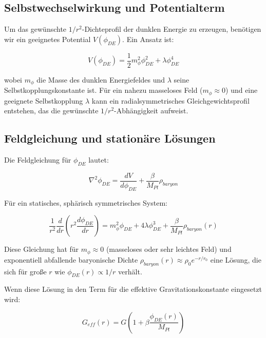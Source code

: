 \documentclass[a4paper,12pt]{article}
\begin{document}
\subsection{Selbstwechselwirkung und Potentialterm}

Um das gewünschte $1/r^2$-Dichteprofil der dunklen Energie zu erzeugen, benötigen wir ein geeignetes Potential $V(\phi_{DE})$. Ein Ansatz ist:

\begin{equation}
	V(\phi_{DE}) = \frac{1}{2}m_{\phi}^2\phi_{DE}^2 + \lambda \phi_{DE}^4
\end{equation}

wobei $m_{\phi}$ die Masse des dunklen Energiefeldes und $\lambda$ seine Selbstkopplungskonstante ist. Für ein nahezu masseloses Feld ($m_{\phi} \approx 0$) und eine geeignete Selbstkopplung $\lambda$ kann ein radialsymmetrisches Gleichgewichtsprofil entstehen, das die gewünschte $1/r^2$-Abhängigkeit aufweist.

\subsection{Feldgleichung und stationäre Lösungen}

Die Feldgleichung für $\phi_{DE}$ lautet:

\begin{equation}
	\nabla^2 \phi_{DE} = \frac{dV}{d\phi_{DE}} + \frac{\beta}{M_{Pl}}\rho_{baryon}
\end{equation}

Für ein statisches, sphärisch symmetrisches System:

\begin{equation}
	\frac{1}{r^2}\frac{d}{dr}\left(r^2\frac{d\phi_{DE}}{dr}\right) = m_{\phi}^2\phi_{DE} + 4\lambda\phi_{DE}^3 + \frac{\beta}{M_{Pl}}\rho_{baryon}(r)
\end{equation}

Diese Gleichung hat für $m_{\phi} \approx 0$ (masseloses oder sehr leichtes Feld) und exponentiell abfallende baryonische Dichte $\rho_{baryon}(r) \approx \rho_0 e^{-r/r_0}$ eine Lösung, die sich für große $r$ wie $\phi_{DE}(r) \propto 1/r$ verhält. 

Wenn diese Lösung in den Term für die effektive Gravitationskonstante eingesetzt wird:

\begin{equation}
	G_{eff}(r) = G\left(1 + \beta\frac{\phi_{DE}(r)}{M_{Pl}}\right)
\end{equation}
\end{document}
